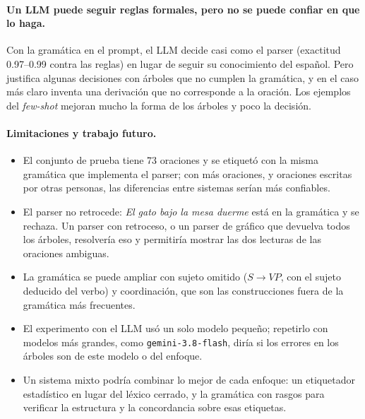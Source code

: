 \paragraph{Un LLM puede seguir reglas formales, pero no se puede confiar en que lo haga.} Con la
gramática en el prompt, el LLM decide casi como el parser (exactitud 0.97--0.99 contra las
reglas) en lugar de seguir su conocimiento del español. Pero justifica algunas decisiones con
árboles que no cumplen la gramática, y en el caso más claro inventa una derivación que no
corresponde a la oración. Los ejemplos del \emph{few-shot} mejoran mucho la forma de los árboles
y poco la decisión.

\paragraph{Limitaciones y trabajo futuro.}
\begin{itemize}
  \item El conjunto de prueba tiene 73 oraciones y se etiquetó con la misma gramática que
    implementa el parser; con más oraciones, y oraciones escritas por otras personas, las
    diferencias entre sistemas serían más confiables.
  \item El parser no retrocede: \emph{El gato bajo la mesa duerme} está en la gramática y se
    rechaza. Un parser con retroceso, o un parser de gráfico que devuelva todos los árboles,
    resolvería eso y permitiría mostrar las dos lecturas de las oraciones ambiguas.
  \item La gramática se puede ampliar con sujeto omitido ($S \to VP$, con el sujeto deducido del
    verbo) y coordinación, que son las construcciones fuera de la gramática más frecuentes.
  \item El experimento con el LLM usó un solo modelo pequeño; repetirlo con modelos más
    grandes, como \texttt{gemini-3.8-flash}, diría si los errores en los árboles son de este
    modelo o del enfoque.
  \item Un sistema mixto podría combinar lo mejor de cada enfoque: un etiquetador estadístico en
    lugar del léxico cerrado, y la gramática con rasgos para verificar la estructura y la
    concordancia sobre esas etiquetas.
\end{itemize}
